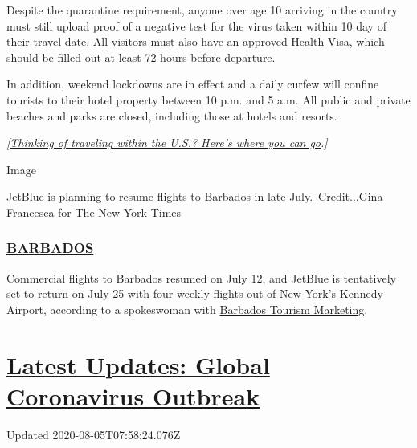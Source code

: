 Despite the quarantine requirement, anyone over age 10 arriving in the
country must still upload proof of a negative test for the virus taken
within 10 day of their travel date. All visitors must also have an
approved Health Visa, which should be filled out at least 72 hours
before departure.

In addition, weekend lockdowns are in effect and a daily curfew will
confine tourists to their hotel property between 10 p.m. and 5 a.m. All
public and private beaches and parks are closed, including those at
hotels and resorts.

\emph{{[}}\href{https://www.nytimes3xbfgragh.onion/2020/07/10/travel/state-travel-restrictions.html}{\emph{Thinking
of traveling within the U.S.? Here's where you can go}}\emph{.{]}}

Image

JetBlue is planning to resume flights to Barbados in late
July.~Credit...Gina Francesca for The New York Times

\hypertarget{barbados}{%
\subsubsection{\texorpdfstring{\href{https://gisbarbados.gov.bb/blog/commercial-air-traffic-resumes-july-12-with-protocols/}{BARBADOS}}{BARBADOS}}\label{barbados}}

Commercial flights to Barbados resumed on July 12, and JetBlue is
tentatively set to return on July 25 with four weekly flights out of New
York's Kennedy Airport, according to a spokeswoman with
\href{https://www.visitbarbados.org}{Barbados Tourism Marketing}.

\hypertarget{latest-updates-global-coronavirus-outbreak}{%
\section{\texorpdfstring{\href{https://www.nytimes3xbfgragh.onion/2020/08/04/world/coronavirus-cases.html?action=click\&pgtype=Article\&state=default\&region=MAIN_CONTENT_1\&context=storylines_live_updates}{Latest
Updates: Global Coronavirus
Outbreak}}{Latest Updates: Global Coronavirus Outbreak}}\label{latest-updates-global-coronavirus-outbreak}}

Updated 2020-08-05T07:58:24.076Z


